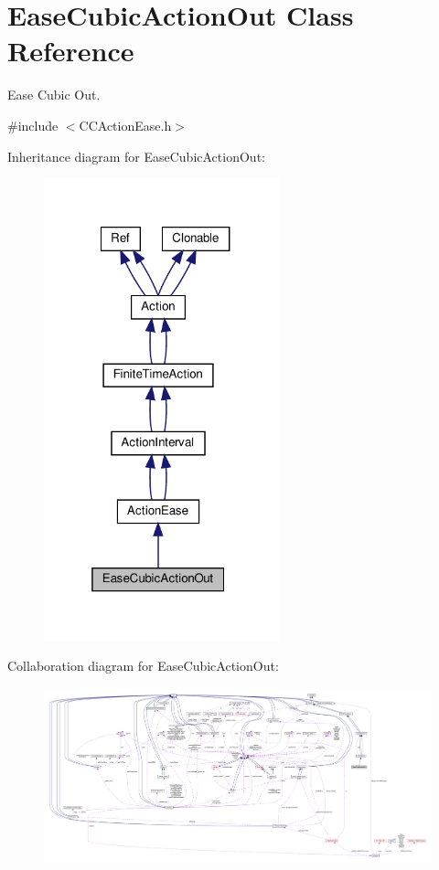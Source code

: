 \hypertarget{classEaseCubicActionOut}{}\section{Ease\+Cubic\+Action\+Out Class Reference}
\label{classEaseCubicActionOut}


Ease Cubic Out.  




{\ttfamily \#include $<$C\+C\+Action\+Ease.\+h$>$}



Inheritance diagram for Ease\+Cubic\+Action\+Out\+:
\nopagebreak
\begin{figure}[H]
\begin{center}
\leavevmode
\includegraphics[width=193pt]{classEaseCubicActionOut__inherit__graph}
\end{center}
\end{figure}


Collaboration diagram for Ease\+Cubic\+Action\+Out\+:
\nopagebreak
\begin{figure}[H]
\begin{center}
\leavevmode
\includegraphics[width=350pt]{classEaseCubicActionOut__coll__graph}
\end{center}
\end{figure}
